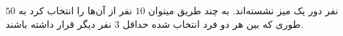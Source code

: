 \EXERCISE
$50$
نفر دور یک میز نشسته‌اند. به چند طریق میتوان
$10$
نفر از آن‌ها را انتخاب کرد به طوری که بین هر دو فرد انتخاب شده حداقل
$3$
نفر دیگر قرار داشته باشند.